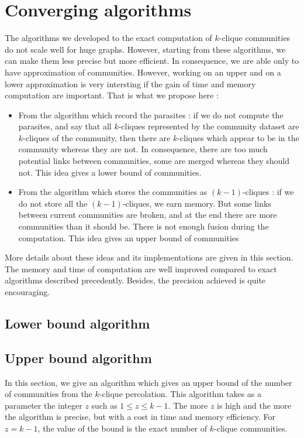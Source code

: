 \section{Converging algorithms}

The algorithms we developed to the exact computation of $k$-clique communities do not scale well for huge graphs. However, starting from these algorithms, we can make them less precise but more efficient. In consequence, we are able only to have approximation of communities. However, working on an upper and on a lower approximation is very intersting if the gain of time and memory computation are important. That is what we propose here :
\begin{itemize}
\item From the algorithm which record the parasites : if we do not compute the parasites, and say that all $k$-cliques represented by the community dataset are $k$-cliques of the community, then there are $k$-cliques which appear to be in the community whereas they are not. In consequence, there are too much potential links between communities, some are merged whereas they should not. This idea gives a lower bound of communities.
\item From the algorithm which stores the communities as $(k-1)$-cliques : if we do not store all the $(k-1)$-cliques, we earn memory. But some links between current communities are broken, and at the end there are more communities than it should be. There is not enough fusion during the computation. This idea gives an upper bound of communities
\end{itemize}

More details about these ideas and its implementations are given in this section. The memory and time of computation are well improved compared to exact algorithms described precedently. Besides, the precision achieved is quite encouraging.

\subsection{Lower bound algorithm}



\subsection{Upper bound algorithm}

In this section, we give an algorithm which gives an upper bound of the number of communities from the $k$-clique percolation. This algorithm takes as a parameter the integer $z$ such as $1 \leq z \leq k-1$. The more $z$ is high and the more the algorithm is precise, but with a cost in time and memory efficiency. For $z=k-1$, the value of the bound is the exact number of $k$-clique communities.

